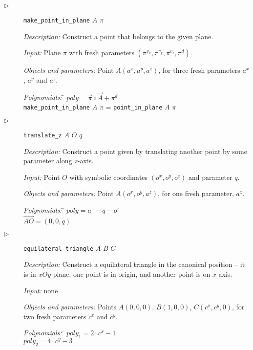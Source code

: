 \documentclass[final,1p,times,authoryear]{elsarticle}
\begin{document}
\begin{description}
\item[$\triangleright$] {\tt make\_point\_in\_plane} $A$ $\pi$ 

  {\em Description:} Construct a point that belongs to the given
  plane.
  
  {\em Input:} Plane $\pi$ with fresh parameters $(\pi^{v_x},
  \pi^{v_y}, \pi^{v_z}, \pi^{d})$.

  {\em Objects and parameters:} Point $A(a^x, a^y, a^z)$, for three
  fresh parameters $a^x$, $a^y$ and $a^z$.

\begin{tabbing}
{\em Polynomials:} \= $poly = \overrightarrow{\pi} \circ \overrightarrow{A} + \pi^{d}$ \\
                   \> {\tt make\_point\_in\_plane} $A$ $\pi$  = {\tt point\_in\_plane} $A$ $\pi$

\end{tabbing}

\item[$\triangleright$] {\tt translate\_z} $A$ $O$ $q$

  {\em Description:} Construct a point given by translating another
  point by some parameter along $z$-axis.
  
  {\em Input:} Point $O$ with symbolic coordinates $(o^x, o^y, o^z)$
  and parameter $q$.

  {\em Objects and parameters:} Point $A(o^x, o^y, a^z)$, for one
  fresh parameter, $a^z$.

\begin{tabbing}
{\em Polynomials:} \= $poly = a^z - q - o^z$ \\
                   $\overrightarrow{AO} = (0, 0, q)$
\end{tabbing}
\item[$\triangleright$] {\tt equilateral\_triangle} $A$ $B$ $C$

  {\em Description:} Construct a equilateral triangle in the canonical
  position -- it is in $xOy$ plane, one point is in origin, and
  another point is on $x$-axis.
  
  {\em Input:} none

  {\em Objects and parameters:} Points $A(0, 0, 0)$, $B(1, 0, 0)$,
  $C(c^x, c^y, 0)$, for two fresh parameters $c^x$ and $c^y$.

\begin{tabbing}
{\em Polynomials:} \= $poly_1 = 2\cdot c^x - 1$ \\
                   \> $poly_2 = 4\cdot c^y - 3$
\end{tabbing}



\end{description}
\end{document}
